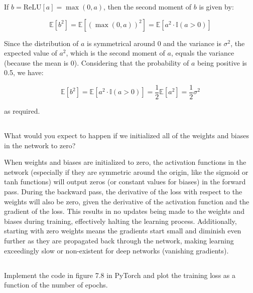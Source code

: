 \documentclass[12pt]{report}
\begin{document}
If $b = \text{ReLU}[a] = \max(0, a)$, then the second moment of $b$ is given by:

\begin{equation*}
    \mathbb{E}[b^{2}] = \mathbb{E}[(\max(0, a))^{2}] = \mathbb{E}[a^{2}\cdot \mathbb{I}(a > 0)]
\end{equation*}

Since the distribution of $a$ is symmetrical around 0 and the variance is $\sigma^{2}$, the expected value of $a^{2}$, which is the second moment of $a$, equals the variance (because the mean is 0). Considering that the probability of $a$ being positive is 0.5, we have:

\begin{equation*}
    \mathbb{E}[b^{2}] = \mathbb{E}[a^{2}\cdot \mathbb{I}(a > 0)] = \frac{1}{2}\mathbb{E}[a^{2}] = \frac{1}{2}\sigma^{2}
\end{equation*}

as required.

\subsection{}
\begin{mdframed}
    What would you expect to happen if we initialized all of the weights and biases
    in the network to zero?
\end{mdframed}

When weights and biases are initialized to zero, the activation functions in the network (especially if they are symmetric around the origin, like the sigmoid or tanh functions) will output zeros (or constant values for biases) in the forward pass. During the backward pass, the derivative of the loss with respect to the weights will also be zero, given the derivative of the activation function and the gradient of the loss. This results in no updates being made to the weights and biases during training, effectively halting the learning process. Additionally, starting with zero weights means the gradients start small and diminish even further as they are propagated back through the network, making learning exceedingly slow or non-existent for deep networks (vanishing gradients).

\subsection{}
\begin{mdframed}
    Implement the code in figure 7.8 in PyTorch and plot the training loss as a
    function of the number of epochs.
\end{mdframed}
\end{document}
